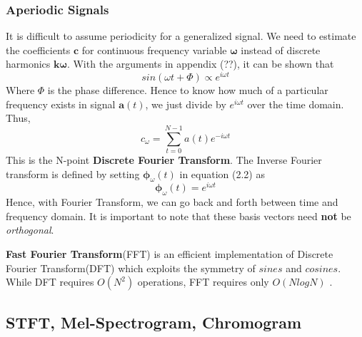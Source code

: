 \subsubsection{Aperiodic Signals}
It is difficult to assume periodicity for a generalized signal. We need to estimate the coefficients $\textbf{c}$ for continuous frequency variable $\bm{\omega}$ instead of discrete harmonics $\textbf{k}\bm{\omega}$. With the arguments in appendix (??), it can be shown that
\begin{equation}
sin(\omega t + \Phi) \propto e^{i \omega t}
\end{equation} 
Where $\Phi$ is the phase difference. Hence to know how much of a particular frequency exists in signal $\textbf{a}(t)$, we just divide by $e^{i \omega t}$ over the time domain. Thus,
\begin{equation}
c_{\omega} =  \displaystyle\sum_{t=0}^{N-1}a(t)e^{-i \omega t}
\end{equation}  
This is the N-point \textbf{Discrete Fourier Transform}. The Inverse Fourier transform is defined by setting $\bm{\phi}_{ \omega }(t)$ in equation (2.2) as
\begin{equation}
\bm{\phi}_{ \omega }(t) = e^{i \omega t}
\end{equation}
Hence, with Fourier Transform, we can go back and forth between time and frequency domain. It is important to note that these basis vectors need \textbf{not} be \textit{orthogonal}.
\bigskip

\textbf{Fast Fourier Transform}(FFT) is an efficient implementation of Discrete Fourier Transform(DFT) which exploits the symmetry of $sines$ and $cosines$. While DFT requires $O(N^2)$ operations, FFT requires only $O(NlogN)$ \cite{allen}.  

\subsection{STFT, Mel-Spectrogram, Chromogram}

